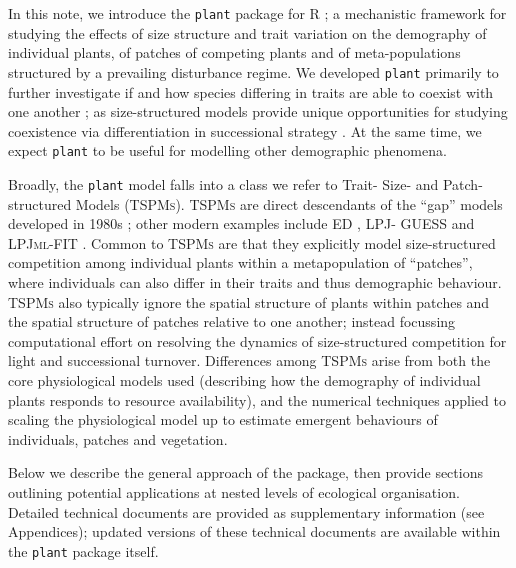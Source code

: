 \documentclass[a4paper,11pt]{article}
\newcommand{\plant}{\texttt{plant}}
\begin{document}
In this note, we introduce the {\plant} package for R \citep{R-2015};
a mechanistic framework for studying the effects of size structure and
trait variation on the demography of individual plants, of patches of
competing plants and of meta-populations structured by a prevailing
disturbance regime.
%
We developed {\plant} primarily to further investigate if and how species
differing in traits are able to coexist with one another
\citep[following ][]{Falster-2011, Falster-2015}; as size-structured models
provide unique opportunities for studying coexistence via differentiation in
successional strategy \citep[see also][]{Huston-1987, Moorcroft-2001}.
At the same time, we expect {\plant} to be useful for
modelling other demographic phenomena.

Broadly, the {\plant} model falls into a class we refer to Trait- Size- and
Patch- structured Models (\textsc{TSPMs}). \textsc{TSPMs} are direct
descendants of the ``gap'' models developed in 1980s
\citep[e.g.][]{Shugart-1980, Huston-1987, Kohyama-1993}; other modern examples
include \textsc{ED} \citep{Moorcroft-2001}, \textsc{LPJ- GUESS}
\citep{Smith-2014} and \textsc{LPJml-FIT} \citep{Sakschewski-2015}. Common to
\textsc{TSPMs} are that they explicitly model size-structured competition
among individual plants within a metapopulation of ``patches'', where
individuals can also differ in their traits and thus demographic behaviour.
\textsc {TSPMs} also typically ignore the spatial structure of plants within
patches and the spatial structure of patches relative to one another; instead
focussing computational effort on resolving the dynamics of size-structured
competition for light and successional turnover. Differences among
\textsc{TSPMs} arise from both the core physiological models used (describing
how the demography of individual plants responds to resource availability),
and the numerical techniques applied to scaling the physiological model up to
estimate emergent behaviours of individuals, patches and vegetation.

Below we describe the general approach of the package, then provide
sections outlining potential applications at nested levels of ecological organisation.
Detailed technical documents are provided as supplementary information
(see Appendices); updated versions of these technical documents are
available within the {\plant} package itself.
\end{document}
